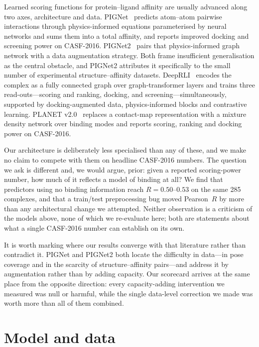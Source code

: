 \documentclass[11pt]{article}
\newcommand{\pearson}{Pearson~$R$}
\begin{document}
Learned scoring functions for protein--ligand affinity are usually advanced along two
axes, architecture and data. PIGNet~\cite{pignet} predicts atom--atom pairwise
interactions through physics-informed equations parameterised by neural networks and sums
them into a total affinity, and reports improved docking and screening power on CASF-2016.
PIGNet2~\cite{pignet2} pairs that physics-informed graph network with a data augmentation
strategy. Both frame insufficient generalisation as the central obstacle, and PIGNet2
attributes it specifically to the small number of experimental structure--affinity
datasets. DeepRLI~\cite{deeprli} encodes the complex as a fully connected graph over
graph-transformer layers and trains three read-outs---scoring and ranking, docking, and
screening---simultaneously, supported by docking-augmented data, physics-informed blocks
and contrastive learning. PLANET v2.0~\cite{planet2} replaces a contact-map representation
with a mixture density network over binding modes and reports scoring, ranking and docking
power on CASF-2016.

Our architecture is deliberately less specialised than any of these, and we make no claim
to compete with them on headline CASF-2016 numbers. The question we ask is different and,
we would argue, prior: given a reported scoring-power number, how much of it reflects a
model of binding at all? We find that predictors using no binding information reach
$R=0.50$--$0.53$ on the same 285 complexes, and that a train/test preprocessing bug moved
\pearson{} by more than any architectural change we attempted. Neither observation is a
criticism of the models above, none of which we re-evaluate here; both are statements
about what a single CASF-2016 number can establish on its own.

It is worth marking where our results converge with that literature rather than contradict
it. PIGNet and PIGNet2 both locate the difficulty in data---in pose coverage and in the
scarcity of structure--affinity pairs---and address it by augmentation rather than by
adding capacity. Our scorecard arrives at the same place from the opposite direction:
every capacity-adding intervention we measured was null or harmful, while the single
data-level correction we made was worth more than all of them combined.

\section{Model and data}
\end{document}
